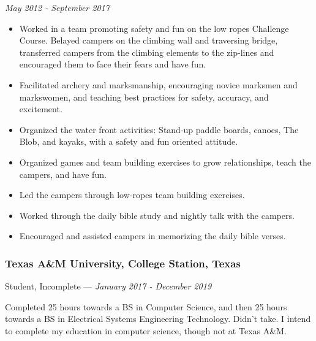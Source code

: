 \documentclass[letterpaper,10pt]{article}
\providecommand{\tightlist}
  {\setlength{\itemsep}{4pt}\setlength{\parskip}{0pt}}
\begin{document}
    \hfill \emph{May 2012 - September 2017}

    \begin{itemize}
        \tightlist{}
        \item
        Worked in a team promoting safety and fun on the low ropes Challenge Course.
        Belayed campers on the climbing wall and traversing bridge, transferred campers from the climbing elements to the zip-lines and encouraged them to face their fears and have fun.
        \item
        Facilitated archery and marksmanship, encouraging novice marksmen and markswomen, and teaching best practices for safety, accuracy, and excitement.
        \item
        Organized the water front activities: Stand-up paddle boards, canoes, The Blob, and kayaks, with a safety and fun oriented attitude.
        \item
        Organized games and team building exercises to grow relationships, teach the campers, and have fun.
        \item
        Led the campers through low-ropes team building exercises.
        \item
        Worked through the daily bible study and nightly talk with the campers.
        \item
        Encouraged and assisted campers in memorizing the daily bible verses.
    \end{itemize}

    \subsubsection{Texas A\&M University, College Station, Texas}
    \hfill Student, Incomplete --- \emph{January 2017 - December 2019}

    Completed 25 hours towards a BS in Computer Science, and then 25 hours towards a BS in Electrical Systems Engineering Technology. Didn't take. I intend to complete my education in computer science, though not at Texas A\&M.
\end{document}
